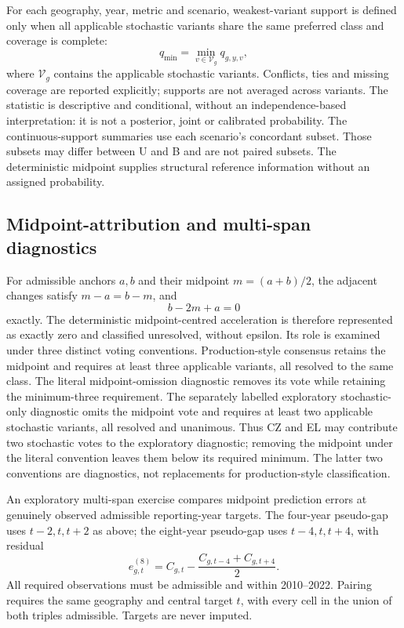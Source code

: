 For each geography, year, metric and scenario, weakest-variant support is defined only when all applicable stochastic variants share the same preferred class and coverage is complete:
\begin{equation}
q_{\min}=\min_{v\in\mathcal V_g}q_{g,y,v},
\end{equation}
where $\mathcal V_g$ contains the applicable stochastic variants. Conflicts, ties and missing coverage are reported explicitly; supports are not averaged across variants. The statistic is descriptive and conditional, without an independence-based interpretation: it is not a posterior, joint or calibrated probability. The continuous-support summaries use each scenario's concordant subset. Those subsets may differ between U and B and are not paired subsets. The deterministic midpoint supplies structural reference information without an assigned probability.

\subsection{Midpoint-attribution and multi-span diagnostics}

For admissible anchors $a,b$ and their midpoint $m=(a+b)/2$, the adjacent changes satisfy $m-a=b-m$, and
\begin{equation}
b-2m+a=0
\end{equation}
exactly. The deterministic midpoint-centred acceleration is therefore represented as exactly zero and classified unresolved, without epsilon. Its role is examined under three distinct voting conventions. Production-style consensus retains the midpoint and requires at least three applicable variants, all resolved to the same class. The literal midpoint-omission diagnostic removes its vote while retaining the minimum-three requirement. The separately labelled exploratory stochastic-only diagnostic omits the midpoint vote and requires at least two applicable stochastic variants, all resolved and unanimous. Thus CZ and EL may contribute two stochastic votes to the exploratory diagnostic; removing the midpoint under the literal convention leaves them below its required minimum. The latter two conventions are diagnostics, not replacements for production-style classification.

An exploratory multi-span exercise compares midpoint prediction errors at genuinely observed admissible reporting-year targets. The four-year pseudo-gap uses $t-2,t,t+2$ as above; the eight-year pseudo-gap uses $t-4,t,t+4$, with residual
\begin{equation}
e^{(8)}_{g,t}=C_{g,t}-\frac{C_{g,t-4}+C_{g,t+4}}{2}.
\end{equation}
All required observations must be admissible and within 2010--2022. Pairing requires the same geography and central target $t$, with every cell in the union of both triples admissible. Targets are never imputed.

